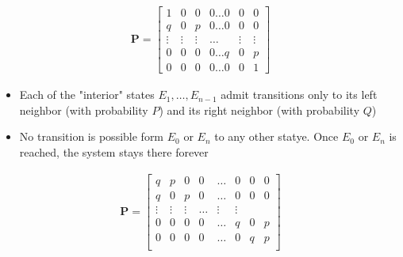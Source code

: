 \begin{example}

\begin{align}
    \mathbf{P} = \begin{bmatrix}
    1 & 0 & 0 & 0 \dots 0 & 0 & 0 \\
    q & 0 & p & 0 \dots 0 & 0 & 0 \\
    \vdots & \vdots & \vdots & \dots & \vdots & \vdots\\
    0 & 0 & 0 & 0 \dots q & 0 & p \\
    0 & 0 & 0 & 0 \dots 0 & 0 & 1
    \end{bmatrix}
\end{align}
\begin{itemize}
\item Each of the "interior" states $E_1, \dots, E_{n-1}$ admit transitions only to its left neighbor (with probability $P$) and its right neighbor (with probability $Q$)
\item No transition is possible form $E_0$ or $E_n$ to any other statye. Once $E_0$ or $E_n$ is reached, the system stays there forever
\end{itemize}
\end{example}

\begin{example}
\begin{align}
    \mathbf{P} = \begin{bmatrix} 
    q & p & 0 & 0 & \dots & 0 & 0 & 0 \\
    q & 0 & p & 0 & \dots & 0 & 0 & 0 \\
    \vdots & \vdots & \vdots & \dots & \vdots & \vdots\\
    0 & 0 & 0 & 0 & \dots & q & 0 & p \\
    0 & 0 & 0 & 0 & \dots & 0 &q & p \\
    \end{bmatrix}
\end{align}
\end{example}

